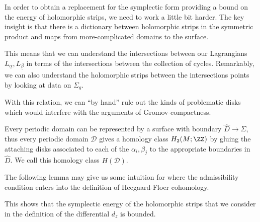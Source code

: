 
In order to obtain a replacement for the symplectic form providing a bound on the energy of holomorphic strips, we need to work a little bit harder. The key insight is that there is a dictionary between holomorphic strips in the symmetric product and maps from more-complicated domains to the surface.


This means that we can understand the intersections between our Lagrangians $L_{\underline \alpha}, L_{\underline \beta}$ in terms of the intersections between the collection of cycles. Remarkably, we can also understand the holomorphic strips between the intersections points by looking at data on $\Sigma_g$. 

With this relation, we can ``by hand'' rule out the kinds of problematic disks which would interfere with the arguments of Gromov-compactness.


    Every periodic domain can be represented by a surface with boundary $\hat D\to \Sigma$, thus every periodic domain $\mathcal D$ gives a homology class $H_2(M; \ZZ)$ by gluing the attaching disks associated to each of the $\alpha_i, \beta_j$ to the appropriate boundaries in $\hat D$. We call this homology class $H(\mathcal D)$.

The following lemma may give us some intuition for where the admissibility condition enters into the definition of Heegaard-Floer cohomology.


This shows that the symplectic energy of the holomorphic strips that we consider in the definition of the differential $d_z$ is bounded. 